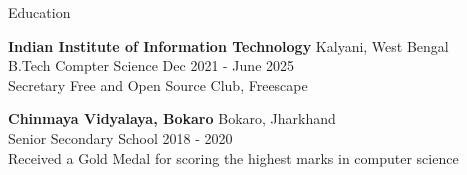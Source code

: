 \documentclass{resume} %
\begin{document}
	



	
	
	\begin{rSection}{Education}
		
		{\bf Indian Institute of Information Technology}  \hfill {Kalyani, West Bengal}\\
		B.Tech Compter Science \hfill {Dec 2021 - June 2025}\\
		Secretary Free and Open Source Club, Freescape 
		
		{\bf Chinmaya Vidyalaya, Bokaro}  \hfill {Bokaro, Jharkhand}\\
		Senior Secondary School \hfill {2018 - 2020} \\
		Received a Gold Medal for scoring the highest marks in computer science
		
	\end{rSection}
\end{document}
